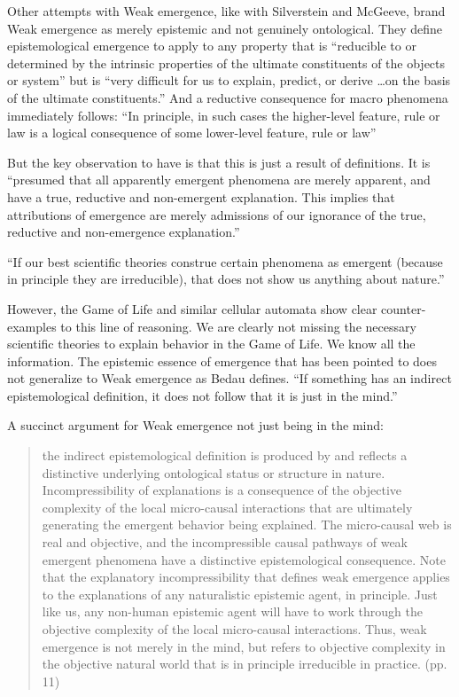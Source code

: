 \documentclass{article}
\begin{document}
Other attempts with Weak emergence, like with Silverstein and McGeeve, brand Weak emergence as merely epistemic and not genuinely ontological. They define epistemological emergence to apply to any property that is ``reducible to or determined by the intrinsic properties of the ultimate constituents of the objects or system'' but is ``very difficult for us to explain, predict, or derive \dots on the basis of the ultimate constituents.'' And a reductive consequence for macro phenomena immediately follows: ``In principle, in such cases the higher-level feature, rule or law is a logical consequence of some lower-level feature, rule or law''

But the key observation to have is that this is just a result of definitions. It is ``presumed that all apparently emergent phenomena are merely apparent, and have a true, reductive and non-emergent explanation. This implies that attributions of emergence are merely admissions of our ignorance of the true, reductive and non-emergence explanation.''

``If our best scientific theories construe certain phenomena as emergent (because in principle they are irreducible), that does not show us anything about nature.''

However, the Game of Life and similar cellular automata show clear counter-examples to this line of reasoning. We are clearly not missing the necessary scientific theories to explain behavior in the Game of Life. We know all the information. The epistemic essence of emergence that has been pointed to does not generalize to Weak emergence as Bedau defines. ``If something has an indirect epistemological definition, it does not follow that it is just in the mind.''

A succinct argument for Weak emergence not just being in the mind:
\begin{quote}
    the indirect epistemological definition is produced by and reflects a distinctive underlying ontological status or structure in nature. Incompressibility of explanations is a consequence of the objective complexity of the local micro-causal interactions that are ultimately generating the emergent behavior being explained. The micro-causal web is real and objective, and the incompressible causal pathways of weak emergent phenomena have a distinctive epistemological consequence. Note that the explanatory incompressibility that defines weak emergence applies to the explanations of any naturalistic epistemic agent, in principle. Just like us, any non-human epistemic agent will have to work through the objective complexity of the local micro-causal interactions. Thus, weak emergence is not merely in the mind, but refers to objective complexity in the objective natural world that is in principle irreducible in practice. (pp. 11)
\end{quote}
\end{document}
